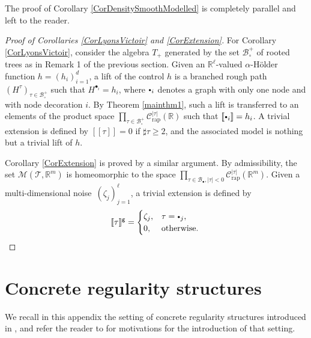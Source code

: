 \documentclass[10pt]{amsart}
\newcommand{\sbullet}{{\scriptscriptstyle\bullet}}
\newcommand{\scbullet}{{\raisebox{1pt}{$\sbullet$}}}
\theoremstyle{plain}
\theoremstyle{definition}
\newcommand{\Brac}[1]{[\![#1]\!]}
\newcommand{\rap}{\mathrm{rap}}
\newcommand{\sfg}{\mathsf{g}}
\newcommand{\scrM}{\mathscr{M}}
\newcommand{\scrT}{\mathscr{T}}
\newcommand{\bbR}{\mathbb{R}}
\newcommand{\mcB}{\mathcal{B}}
\newcommand{\mcC}{\mathcal{C}}
\begin{document}
The proof of Corollary \ref{CorDensitySmoothModelled} is completely parallel and left to the reader.

\begin{proof}[Proof of Corollaries \ref{CorLyonsVictoir} and \ref{CorExtension}]
For Corollary \ref{CorLyonsVictoir}, consider the algebra $T_+$ generated by the set $\mcB_\circ^+$ of rooted trees as in Remark 1 of the previous section. Given an $\bbR^\ell$\nobreakdash-valued $\alpha$-Hölder function $h=(h_i)_{i=1}^d$, a lift of the control $h$ is a branched rough path $(H^\tau)_{\tau\in\mcB_\circ^+}$ such that $H^{\sbullet_i}=h_i$, where $\scbullet_i$ denotes a graph with only one node and with node decoration $i$. By Theorem \ref{mainthm1}, such a lift is transferred to an elements of the product space $\prod_{\tau\in\mcB_\circ^+} \mcC_\rap^{|\tau|}(\bbR)$ such that $\Brac{\scbullet_i}=h_i$. A trivial extension is defined by $\Brac{\tau}=0$ if $\sharp\tau\ge2$, and the associated model is nothing but a trivial lift of $h$.

Corollary \ref{CorExtension} is proved by a similar argument. By admissibility, the set $\scrM(\scrT,\bbR^m)$ is homeomorphic to the space $\prod_{\tau\in\mcB_\sbullet, |\tau|<0} \mcC_\rap^{|\tau|}(\bbR^m)$.
Given a multi-dimensional noise~$(\zeta_j)_{j=1}^\ell$, a trivial extension is defined by\vspace*{-3pt}
\[
\Brac{\tau}^{\sfg}=
\begin{cases}
\zeta_j, & \tau=\scbullet_j,\\
0, & \text{otherwise}.
\end{cases} \qedhere
\]
\end{proof}

\appendix
\section{Concrete regularity structures}
\label{SectionAppendixConcreteRS}

We recall in this appendix the setting of concrete regularity structures introduced in \cite{BH}, and refer the reader to \cite[\S2]{BH} for motivations for the introduction of that setting.
\end{document}
